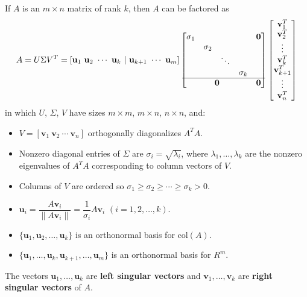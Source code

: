 \documentclass{article}
\begin{document}
\begin{tcolorbox}[colback=red!4, colframe=red!60!black,
  title={\textbf{Theorem 9.4.4 --- Singular Value Decomposition (Expanded Form)}},
  boxrule=0.5mm, arc=3mm]
If $A$ is an $m\times n$ matrix of rank $k$, then $A$ can be factored as
\[
  A = U\Sigma V^T = [\mathbf{u}_1\ \mathbf{u}_2\ \cdots\ \mathbf{u}_k\ |\ \mathbf{u}_{k+1}\ \cdots\ \mathbf{u}_m]
  \begin{bmatrix}
    \sigma_1 & & & & \mathbf{0}\\
    & \sigma_2 & & &\\
    & & \ddots & &\\
    & & & \sigma_k &\\
    \hline
    \multicolumn{4}{c}{\mathbf{0}} & \mathbf{0}
  \end{bmatrix}
  \begin{bmatrix}\mathbf{v}_1^T\\\mathbf{v}_2^T\\\vdots\\\mathbf{v}_k^T\\\mathbf{v}_{k+1}^T\\\vdots\\\mathbf{v}_n^T\end{bmatrix}
\]
in which $U$, $\Sigma$, $V$ have sizes $m\times m$, $m\times n$, $n\times n$, and:
\begin{itemize}
  \item[(a)] $V = [\mathbf{v}_1\ \mathbf{v}_2\ \cdots\ \mathbf{v}_n]$ orthogonally diagonalizes $A^TA$.
  \item[(b)] Nonzero diagonal entries of $\Sigma$ are $\sigma_i = \sqrt{\lambda_i}$,
        where $\lambda_1,\ldots,\lambda_k$ are the nonzero eigenvalues of $A^TA$
        corresponding to column vectors of $V$.
  \item[(c)] Columns of $V$ are ordered so $\sigma_1\ge\sigma_2\ge\cdots\ge\sigma_k>0$.
  \item[(d)] $\mathbf{u}_i = \dfrac{A\mathbf{v}_i}{\|A\mathbf{v}_i\|} = \dfrac{1}{\sigma_i}A\mathbf{v}_i$
        \quad$(i=1,2,\ldots,k)$.
  \item[(e)] $\{\mathbf{u}_1,\mathbf{u}_2,\ldots,\mathbf{u}_k\}$ is an orthonormal basis for $\mathrm{col}(A)$.
  \item[(f)] $\{\mathbf{u}_1,\ldots,\mathbf{u}_k,\mathbf{u}_{k+1},\ldots,\mathbf{u}_m\}$ is an
        orthonormal basis for $R^m$.
\end{itemize}
The vectors $\mathbf{u}_1,\ldots,\mathbf{u}_k$ are \textbf{left singular vectors} and
$\mathbf{v}_1,\ldots,\mathbf{v}_k$ are \textbf{right singular vectors} of $A$.
\end{tcolorbox}
\end{document}
